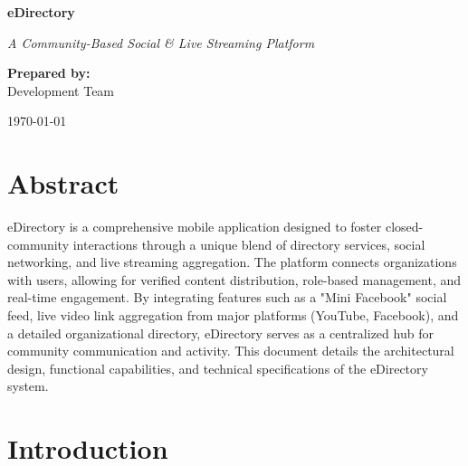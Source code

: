\documentclass[12pt, a4paper]{report}
\begin{document}
\begin{titlepage}
    \centering
    \vspace*{2cm}
    
    {\Huge \textbf{eDirectory}}
    
    \vspace{0.5cm}
    {\Large \textit{A Community-Based Social \& Live Streaming Platform}}
    
    \vspace{3cm}
    
    {\Large \textbf{Prepared by:}} \\
    \vspace{0.2cm}
    {\Large Development Team}
    
    \vspace{2cm}
    
    {\Large \today}
    
    \vfill
\end{titlepage}

\chapter*{Abstract}
eDirectory is a comprehensive mobile application designed to foster closed-community interactions through a unique blend of directory services, social networking, and live streaming aggregation. The platform connects organizations with users, allowing for verified content distribution, role-based management, and real-time engagement. By integrating features such as a "Mini Facebook" social feed, live video link aggregation from major platforms (YouTube, Facebook), and a detailed organizational directory, eDirectory serves as a centralized hub for community communication and activity. This document details the architectural design, functional capabilities, and technical specifications of the eDirectory system.

\tableofcontents

\chapter{Introduction}
\end{document}
